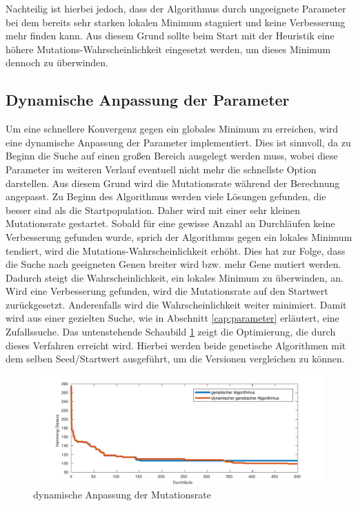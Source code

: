 Nachteilig ist hierbei jedoch, dass der Algorithmus durch ungeeignete Parameter bei dem bereits sehr starken lokalen Minimum stagniert und keine Verbesserung mehr finden kann. Aus diesem Grund sollte beim Start mit der Heuristik eine höhere Mutations-Wahrscheinlichkeit eingesetzt werden, um dieses Minimum dennoch zu überwinden.

\subsection{Dynamische Anpassung der Parameter}
Um eine schnellere Konvergenz gegen ein globales Minimum zu erreichen, wird eine dynamische Anpassung der Parameter implementiert. Dies ist sinnvoll, da zu Beginn die Suche auf einen großen Bereich ausgelegt werden muss, wobei diese Parameter im weiteren Verlauf eventuell nicht mehr die schnellste Option darstellen. Aus diesem Grund wird die Mutationsrate während der Berechnung angepasst. Zu Beginn des Algorithmus werden viele Lösungen gefunden, die besser sind als die Startpopulation. Daher wird mit einer sehr kleinen Mutationsrate gestartet. Sobald für eine gewisse Anzahl an Durchläufen keine Verbesserung gefunden wurde, sprich der Algorithmus gegen ein lokales Minimum tendiert, wird die Mutations-Wahrscheinlichkeit erhöht. Dies hat zur Folge, dass die Suche nach geeigneten Genen breiter wird bzw. mehr Gene mutiert werden. Dadurch steigt die Wahrscheinlichkeit, ein lokales Minimum zu überwinden, an. Wird eine Verbesserung gefunden, wird die Mutationsrate auf den Startwert zurückgesetzt. Anderenfalls wird die Wahrscheinlichkeit weiter minimiert. Damit wird aus einer gezielten Suche, wie in Abschnitt \ref{cap:parameter} erläutert, eine Zufallssuche.
Das untenstehende Schaubild \ref{fig:dyn_genetic} zeigt die Optimierung, die durch dieses Verfahren erreicht wird. Hierbei werden beide genetische Algorithmen mit dem selben Seed/Startwert ausgeführt, um die Versionen vergleichen zu können.

\begin{figure}[H]
	\centering
	\includegraphics[width=\textwidth]{fig/dyn_genetic.pdf}
	\caption{dynamische Anpassung der Mutationsrate}
	\label{fig:dyn_genetic}
\end{figure}
 
